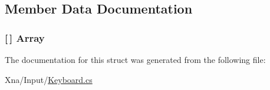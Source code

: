 \subsection{Member Data Documentation}
\hypertarget{structMicrosoft_1_1Xna_1_1Framework_1_1Input_1_1Keyboard_a680de05037cef7d211549b3698c661d4}{}
\subsubsection[{Array}]{ \mbox{[}$\,$\mbox{]} Array\hspace{0.3cm}{\ttfamily [static]}}\label{structMicrosoft_1_1Xna_1_1Framework_1_1Input_1_1Keyboard_a680de05037cef7d211549b3698c661d4}


The documentation for this struct was generated from the following file\+:\begin{DoxyCompactItemize}
\item 
Xna/\+Input/\hyperlink{Keyboard_8cs}{Keyboard.\+cs}\end{DoxyCompactItemize}
